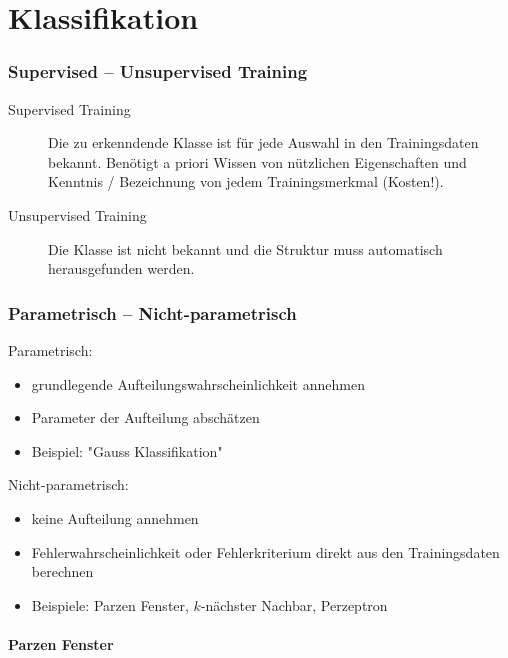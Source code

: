 
\chapter{Klassifikation}

\subsection{Supervised -- Unsupervised Training}

\begin{description}
\item[Supervised Training] Die zu erkenndende Klasse ist für jede Auswahl in den Trainingsdaten bekannt. Benötigt a priori Wissen von nützlichen Eigenschaften und Kenntnis / Bezeichnung von jedem Trainingsmerkmal (Kosten!).
\item[Unsupervised Training] Die Klasse ist nicht bekannt und die Struktur muss automatisch herausgefunden werden.
\end{description}

\subsection{Parametrisch -- Nicht-parametrisch}

Parametrisch:
\begin{itemize}
\item grundlegende Aufteilungswahrscheinlichkeit annehmen
\item Parameter der Aufteilung abschätzen
\item Beispiel: "{}Gauss Klassifikation"{}
\end{itemize}
Nicht-parametrisch:
\begin{itemize}
\item keine Aufteilung annehmen
\item Fehlerwahrscheinlichkeit oder Fehlerkriterium direkt aus den Trainingsdaten berechnen
\item Beispiele: Parzen Fenster, $k$-nächster Nachbar, Perzeptron
\end{itemize}

\subsubsection*{Parzen Fenster}

